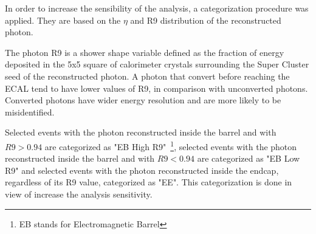 In order to increase the sensibility of the analysis, a categorization procedure was applied.
 They are based on the $\eta$ and R9 distribution of the reconstructed photon.

The photon R9 is a shower shape variable defined as the fraction of energy deposited in the 5x5 square  of calorimeter crystals surrounding the Super Cluster seed of the reconstructed photon. A photon that convert before reaching the ECAL tend to have lower values of R9, in comparison with unconverted photons. Converted photons have wider energy resolution and are more likely to be misidentified.  






Selected events with the photon reconstructed inside the barrel and with $R9 > 0.94$ are categorized as "EB High R9"~\footnote{EB stands for Electromagnetic Barrel}, selected events with the photon reconstructed inside the barrel and with $R9 < 0.94$ are categorized as "EB Low R9" and selected events with the photon reconstructed inside the endcap, regardless of its R9 value, categorized as "EE". This categorization is done in view of increase the analysis sensitivity. 

